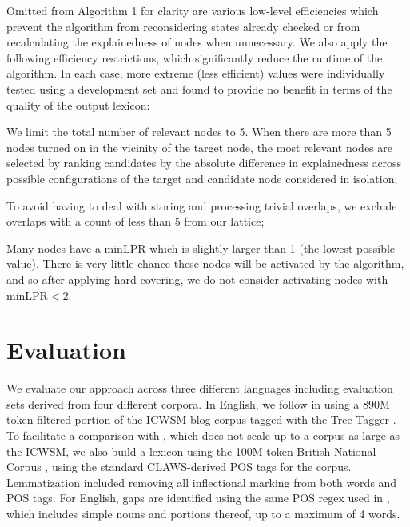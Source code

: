 \documentclass[11pt,letterpaper]{article}
\newcommand{\minLPR}{\ensuremath{\text{minLPR}}}
\begin{document}
Omitted from Algorithm 1 for clarity are various low-level efficiencies which prevent the algorithm from reconsidering states already checked or from recalculating the explainedness of nodes when unnecessary. We also apply the following efficiency restrictions, which significantly reduce the runtime of the algorithm. In each case, more extreme (less efficient) values were individually tested using a development set and found to provide no benefit in terms of the quality of the output lexicon:
\begin{compactitem}
\item We limit the total number of relevant nodes to 5. When there are more than 5 nodes turned on in the vicinity of the target node, the most relevant nodes are selected by ranking candidates by the absolute difference in explainedness across possible configurations of the target and candidate node considered in isolation;
\item To avoid having to deal with storing and processing trivial overlaps, we exclude overlaps with a count of less than 5 from our lattice;
\item Many nodes have a minLPR which is slightly larger than 1 (the lowest possible value). There is very little chance these nodes will be activated by the algorithm, and so after applying hard covering, we do not consider activating nodes with $\minLPR < 2$.
\end{compactitem}

\section{Evaluation}
\label{sec:evaluation}

We evaluate our approach across three different languages including evaluation sets derived from four different corpora. In English, we follow  in using a 890M token filtered portion of the ICWSM blog corpus \cite{ICWSM} tagged with the Tree Tagger \cite{Schmid95}. To facilitate a comparison with , which does not scale up to a corpus as large as the ICWSM, we also build a lexicon using the 100M token British National Corpus \cite{BNC}, using the standard CLAWS-derived POS tags for the corpus. Lemmatization included removing all inflectional marking from both words and POS tags. For English, gaps are identified using the same POS regex used in , which includes simple nouns and portions thereof, up to a maximum of 4 words.
\end{document}
